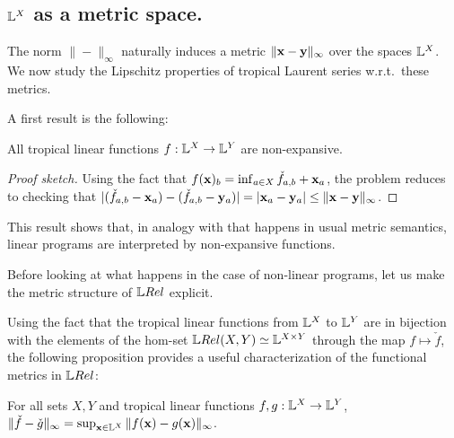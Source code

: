 \subsection{$\mathbb{L}^{X}$ as a metric space.}



The norm $\|-\|_\infty$ naturally induces a metric $\|\mathbf{x}-\mathbf{y}\|_{\infty}$ over the spaces $\mathbb{L}^{X}$. 
We now study the Lipschitz properties of tropical Laurent series w.r.t.~these metrics. 

A first result is the following:
\begin{proposition}\label{prop:troplinear}
All tropical linear functions $f: \mathbb{L}^{X}\to \mathbb{L}^{Y}$ are non-expansive.  
\end{proposition}
\begin{proof}[Proof sketch]
Using the fact that $f(\mathbf{x})_{b}= \inf_{a\in X}\check f_{a,b}+\mathbf{x}_{a}$,
the problem reduces to checking that $|(\check f_{a,b}-\mathbf{x}_{a})- (\check f_{a,b}-\mathbf{y}_{a})| = |\mathbf{x}_{a}-\mathbf{y}_{a}|\leq \| \mathbf{x}-\mathbf{y}\|_{\infty}$.\end{proof}
This result shows that, in analogy with that happens in usual metric semantics, linear programs are interpreted by non-expansive functions. 

Before looking at what happens in the case of non-linear programs, let us make the metric structure of $\LREL$ explicit. 

Using the fact that the tropical linear functions from $\mathbb{L}^{X}$ to $\mathbb{L}^{Y}$ are in bijection with the elements of the hom-set $\LREL(X,Y)\simeq \Lawv^{X\times Y}$ through the map $f\mapsto \check f$, the following proposition provides a useful characterization of the functional metrics in $\LREL$:
\begin{proposition}
For all sets $X,Y$ and tropical linear functions $f,g:\mathbb{L}^{X}\to \mathbb{L}^{Y}$, $\| \check f-\check g\|_{\infty} =  \sup_{\mathbf{x}\in \mathbb{L}^{X}}
\| f(\mathbf{x})-g(\mathbf{x})\|_{\infty}$.\end{proposition}


